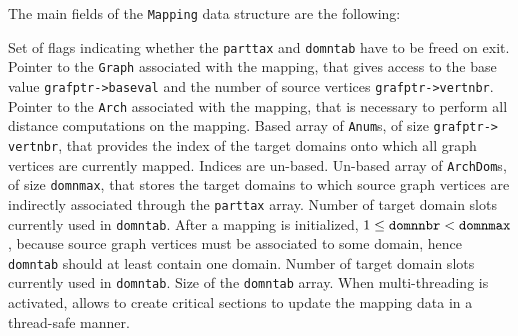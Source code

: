 The main fields of the \texttt{Mapping} data structure are the following:
\begin{itemize}
  Set of flags indicating whether the \texttt{parttax} and
  \texttt{domntab} have to be freed on exit.
  Pointer to the \texttt{Graph} associated with the mapping, that
  gives access to the base value \texttt{grafptr->\lbt baseval} and
  the number of source vertices \texttt{grafptr->\lbt vertnbr}.
  Pointer to the \texttt{Arch} associated with the mapping, that is
  necessary to perform all distance computations on the mapping.
  Based array of \texttt{Anum}s, of size \texttt{grafptr->\lbt
  vertnbr}, that provides the index of the target domains onto which
  all graph vertices are currently mapped. Indices are un-based.
  Un-based array of \texttt{ArchDom}s, of size \texttt{domnmax}, that
  stores the target domains to which source graph vertices are
  indirectly associated through the \texttt{parttax} array.
  Number of target domain slots currently used in
  \texttt{domntab}. After a mapping is initialized, $1 \leq
  \mbox{\texttt{domnnbr}} < \mbox{\texttt{domnmax}}$, because source
  graph vertices must be associated to some domain, hence
  \texttt{domntab} should at least contain one domain.
  Number of target domain slots currently used in
  \texttt{domntab}.
  Size of the \texttt{domntab} array.
  When multi-threading is activated, allows to create critical
  sections to update the mapping data in a thread-safe manner.
\end{itemize}
